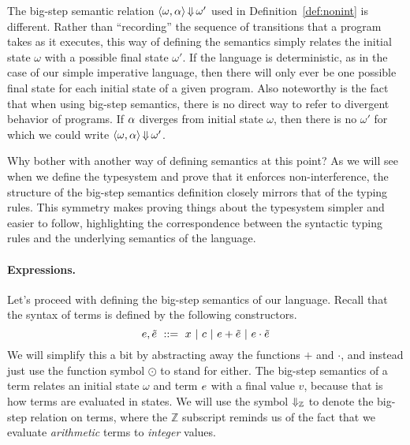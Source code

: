 \documentclass[11pt,twoside]{scrartcl}
\begin{document}
The big-step semantic relation $\langle \omega, \alpha\rangle \operatorname{\Downarrow} \omega'$ used in Definition~\ref{def:nonint} is different. Rather than ``recording'' the sequence of transitions that a program takes as it executes, this way of defining the semantics simply relates the initial state $\omega$ with a possible final state $\omega'$. If the language is deterministic, as in the case of our simple imperative language, then there will only ever be one possible final state for each initial state of a given program. Also noteworthy is the fact that when using big-step semantics, there is no direct way to refer to divergent behavior of programs. If $\alpha$ diverges from initial state $\omega$, then there is no $\omega'$ for which we could write $\langle \omega, \alpha\rangle \operatorname{\Downarrow} \omega'$.

Why bother with another way of defining semantics at this point? As we will see when we define the typesystem and prove that it enforces non-interference, the structure of the big-step semantics definition closely mirrors that of the typing rules. This symmetry makes proving things about the typesystem simpler and easier to follow, highlighting the correspondence between the syntactic typing rules and the underlying semantics of the language.

\paragraph{Expressions.} Let's proceed with defining the big-step semantics of our language. Recall that the syntax of terms is defined by the following constructors.
\[
  e,\tilde{e} ~\mathrel{::=}~
  x
  ~|~
  c
  ~|~
  e+\tilde{e}
  ~|~
  e\cdot\tilde{e}
\]
We will simplify this a bit by abstracting away the functions $+$ and $\cdot$, and instead just use the function symbol $\odot$ to stand for either. The big-step semantics of a term relates an initial state $\omega$ and term $e$ with a final value $v$, because that is how terms are evaluated in states. We will use the symbol $\operatorname{\Downarrow_{\mathbb{Z}}}$ to denote the big-step relation on terms, where the $\mathbb{Z}$ subscript reminds us of the fact that we evaluate \emph{arithmetic} terms to \emph{integer} values.
\end{document}
